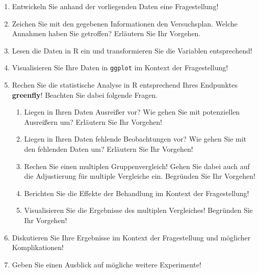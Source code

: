 \documentclass{scrartcl}\usepackage[]{graphicx}\usepackage[]{xcolor}
\begin{document}
\begin{enumerate}
\item Entwickeln Sie anhand der vorliegenden Daten eine Fragestellung!
\item Zeichen Sie mit den gegebenen Informationen den Versuchsplan. Welche Annahmen haben Sie getroffen? Erläutern Sie Ihr Vorgehen.
\item Lesen die Daten in R ein und transformieren Sie die Variablen entsprechend!
\item Visualisieren Sie Ihre Daten in \texttt{ggplot} im Kontext der Fragestellung!
\item Rechen Sie die statistische Analyse in R entsprechend Ihres Endpunktes \textbf{greenfly}! Beachten Sie dabei folgende Fragen.
\begin{enumerate}
\item Liegen in Ihren Daten Ausreißer vor? Wie gehen Sie mit potenziellen Ausreißern um? Erläutern Sie Ihr Vorgehen!
\item Liegen in Ihren Daten fehlende Beobachtungen vor? Wie gehen Sie mit den fehlenden Daten um? Erläutern Sie Ihr Vorgehen!
\item Rechen Sie einen multiplen Gruppenvergleich! Gehen Sie dabei auch auf die Adjustierung für multiple Vergleiche ein. Begründen Sie Ihr Vorgehen!
\item Berichten Sie die Effekte der Behandlung im Kontext der Fragestellung! 
\item Visualisieren Sie die Ergebnisse des multiplen Vergleiches! Begründen Sie Ihr Vorgehen!
\end{enumerate}
\item Diskutieren Sie Ihre Ergebnisse im Kontext der Fragestellung und möglicher Komplikationen!
\item Geben Sie einen Ausblick auf mögliche weitere Experimente!
\end{enumerate}
\end{document}
